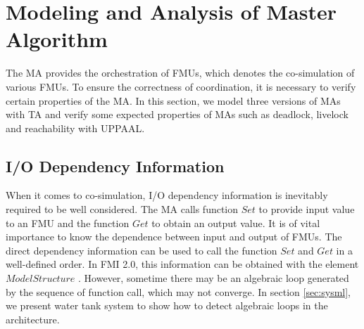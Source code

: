 \section{Modeling and Analysis of Master Algorithm}
\label{sec:ma}
The MA provides the orchestration of FMUs, which denotes the co-simulation of various FMUs. To ensure the correctness of coordination, it is necessary to verify certain properties of the MA. In this section, we model three versions of MAs with TA and verify some expected properties of MAs such as deadlock, livelock and reachability with UPPAAL.
\subsection{I/O Dependency Information}
When it comes to co-simulation, I/O dependency information \cite{BromanBGLMTW13} is inevitably required to be well considered. The MA calls function $Set$ to provide input value to an FMU and the function $Get$ to obtain an output value. It is of vital importance to know the dependence between input and output of FMUs. The direct dependency information can be used to call the function $Set$ and $Get$ in a well-defined order. In FMI 2.0, this information can be obtained with the element $ModelStructure$ \cite{FMI2INTRO}. However, sometime there may be an algebraic loop generated by the sequence of function call, which may not converge. In section \ref{sec:sysml}, we present water tank system to show how to detect algebraic loops in the architecture.
